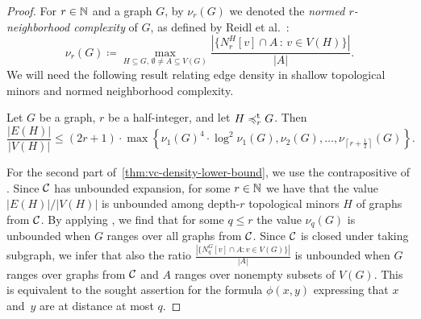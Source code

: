 \begin{proof}
For $r\in \mathbb{N}$ and a graph $G$, by $\nu_r(G)$ we denoted the
\emph{normed $r$-neighborhood complexity} of $G$, as defined
by Reidl et al.~\cite{reidl2016characterising}: 
\begin{equation*}
\nu_r(G)\coloneqq\max_{H\subseteq G,\,\emptyset\neq A\subseteq V(G)}\frac{|\{N_r^H[v]\cap A\, \colon\, v\in V(H)\}|}{|A|}.
\end{equation*}
We will need the following result relating edge density in shallow topological minors and normed neighborhood complexity.

\begin{lemma}\label{lem:lower-be}
Let $G$ be a graph, $r$ be a half-integer, 
and let $H\preccurlyeq_r^{\mathrm{t}}G$. 
Then 
$$\frac{|E(H)|}{|V(H)|}\leq (2r + 1)\cdot \max \left\{\nu_1(G)^4\cdot \log^2\nu_1(G),\nu_2(G),\ldots, \nu_{\left\lceil r+\frac{1}{2}\right\rceil}(G)\right\}.$$
\end{lemma}

For the second part of~\cref{thm:vc-density-lower-bound}, we use the contrapositive of . Since $\mathcal{C}$ has unbounded expansion, for some $r\in \mathbb{N}$ 
we have that the value $|E(H)|/|V(H)|$ is unbounded among depth-$r$ topological minors $H$ of graphs from $\mathcal{C}$.
By applying , we find that for some $q\leq r$ the value
$\nu_{q}(G)$ is unbounded when $G$ ranges over all graphs from $\mathcal{C}$. 
Since $\mathcal{C}$ is closed under taking subgraph, we infer that also the ratio 
$\frac{|\{N_q^G[v]\cap A \colon v\in V(G)\}|}{|A|}$ is unbounded when $G$ ranges over graphs from $\mathcal{C}$ and $A$ ranges over nonempty subsets of $V(G)$.
This is equivalent to the sought assertion for the formula $\phi(x,y)$ expressing that $x$ and~$y$ are at distance at most $q$. 
\end{proof}


